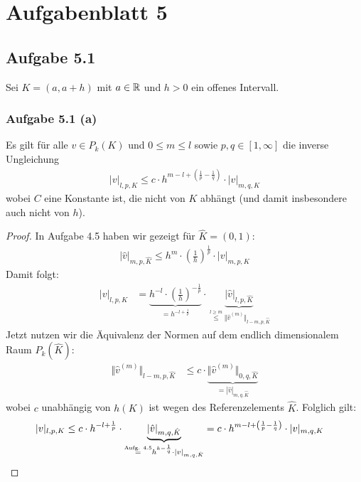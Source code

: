 
\section{Aufgabenblatt 5}
\subsection{Aufgabe 5.1}
Sei $K=(a,a+h)$ mit $a\in\mathbb{R}$ und $h>0$ ein offenes Intervall.

\subsubsection{Aufgabe 5.1 (a)}
Es gilt für alle $v\in P_k(K)$ und $0\leq m\leq l$ sowie $p,q\in[1,\infty]$ die inverse Ungleichung
\begin{align*}
	|v|_{l,p,K}\leq c\cdot h^{m-l+\left(\frac{1}{p}-\frac{1}{q}\right)}\cdot|v|_{m,q,K}
\end{align*}
wobei $C$ eine Konstante ist, die nicht von $K$ abhängt (und damit insbesondere auch nicht von $h$).

\begin{proof}
	In Aufgabe 4.5 haben wir gezeigt für $\hat{K}=(0,1)$:
	\begin{align*}
		|\hat{v}|_{m,p,\hat{K}}\leq h^m\cdot\left(\frac{1}{h}\right)^{\frac{1}{p}}\cdot|v|_{m,p,K}
	\end{align*}
	Damit folgt:
	\begin{align*}
		|v|_{l,p,K}
		&=\underbrace{h^{-l}\cdot\left(\frac{1}{h}\right)^{-\frac{1}{p}}}_{=h^{-l+\frac{1}{p}}}\cdot\underbrace{|\hat{v}|_{l,p,\hat{K}}}_{\stackrel{l\geq m}{\leq}\Vert \hat{v}^{(m)}\Vert_{l-m,p,\hat{K}}}
	\end{align*}
	Jetzt nutzen wir die Äquivalenz der Normen auf dem endlich dimensionalem Raum $P_k(\hat{K})$:
	\begin{align*}
		\Vert \hat{v}^{(m)}\Vert_{l-m,p,\hat{K}}
		&\leq
		c\cdot\underbrace{\Vert\hat{v}^{(m)}\Vert_{0,q,\hat{K}}}_{=|\hat{v}|_{m,q,\hat{K}}}
	\end{align*}
	wobei $c$ unabhängig von $h(K)$ ist wegen des Referenzelements $\hat{K}$. Folglich gilt:
	\begin{align*}
		|v|_{l,p,K}
		&\leq
		c\cdot h^{-l+\frac{1}{p}}\cdot\underbrace{|\hat{v}|_{m,q,\hat{K}}}_{\stackrel{\text{Aufg. 4.5}}{=}h^{k-\frac{1}{q}}\cdot|v|_{m,q,\hat{K}}}
		=c\cdot h^{m-l+\left(\frac{1}{p}-\frac{1}{q}\right)}\cdot|v|_{m,q,K}
	\end{align*}
\end{proof}

